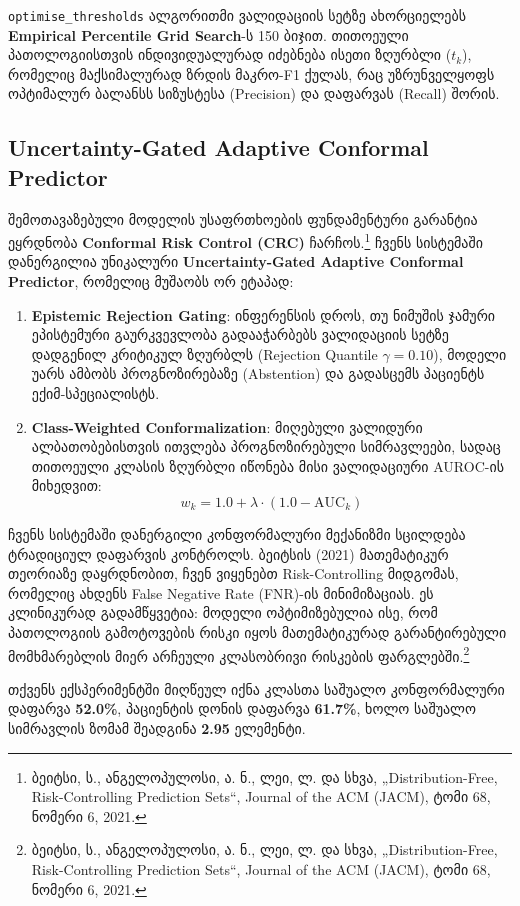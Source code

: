 \documentclass[12pt,a4paper,oneside]{report}
\begin{document}
\texttt{optimise\_thresholds} ალგორითმი ვალიდაციის სეტზე ახორციელებს \textbf{Empirical Percentile Grid Search}-ს 150 ბიჯით. თითოეული პათოლოგიისთვის ინდივიდუალურად იძებნება ისეთი ზღურბლი ($t_k$), რომელიც მაქსიმალურად ზრდის მაკრო-F1 ქულას, რაც უზრუნველყოფს ოპტიმალურ ბალანსს სიზუსტესა (Precision) და დაფარვას (Recall) შორის.

\subsection{Uncertainty-Gated Adaptive Conformal Predictor}
შემოთავაზებული მოდელის უსაფრთხოების ფუნდამენტური გარანტია ეყრდნობა \textbf{Conformal Risk Control (CRC)} ჩარჩოს.\footnote{ბეიტსი, ს., ანგელოპულოსი, ა. ნ., ლეი, ლ. და სხვა, „Distribution-Free, Risk-Controlling Prediction Sets“, Journal of the ACM (JACM), ტომი 68, ნომერი 6, 2021.} ჩვენს სისტემაში დანერგილია უნიკალური \textbf{Uncertainty-Gated Adaptive Conformal Predictor}, რომელიც მუშაობს ორ ეტაპად:

\begin{enumerate}[leftmargin=1.6em]
    \item \textbf{Epistemic Rejection Gating}: ინფერენსის დროს, თუ ნიმუშის ჯამური ეპისტემური გაურკვევლობა გადააჭარბებს ვალიდაციის სეტზე დადგენილ კრიტიკულ ზღურბლს (Rejection Quantile $\gamma = 0.10$), მოდელი უარს ამბობს პროგნოზირებაზე (Abstention) და გადასცემს პაციენტს ექიმ-სპეციალისტს. 
    \item \textbf{Class-Weighted Conformalization}: მიღებული ვალიდური ალბათობებისთვის ითვლება პროგნოზირებული სიმრავლეები, სადაც თითოეული კლასის ზღურბლი იწონება მისი ვალიდაციური AUROC-ის მიხედვით:
    \begin{equation}
    w_k = 1.0 + \lambda \cdot (1.0 - \text{AUC}_k)
    \end{equation}
\end{enumerate}

ჩვენს სისტემაში დანერგილი კონფორმალური მექანიზმი სცილდება ტრადიციულ დაფარვის კონტროლს. ბეიტსის (2021) მათემატიკურ თეორიაზე დაყრდნობით, ჩვენ ვიყენებთ Risk-Controlling მიდგომას, რომელიც ახდენს False Negative Rate (FNR)-ის მინიმიზაციას. ეს კლინიკურად გადამწყვეტია: მოდელი ოპტიმიზებულია ისე, რომ პათოლოგიის გამოტოვების რისკი იყოს მათემატიკურად გარანტირებული მომხმარებლის მიერ არჩეული კლასობრივი რისკების ფარგლებში.\footnote{ბეიტსი, ს., ანგელოპულოსი, ა. ნ., ლეი, ლ. და სხვა, „Distribution-Free, Risk-Controlling Prediction Sets“, Journal of the ACM (JACM), ტომი 68, ნომერი 6, 2021.} 

თქვენს ექსპერიმენტში მიღწეულ იქნა კლასთა საშუალო კონფორმალური დაფარვა \textbf{52.0\%}, პაციენტის დონის დაფარვა \textbf{61.7\%}, ხოლო საშუალო სიმრავლის ზომამ შეადგინა \textbf{2.95} ელემენტი.
\end{document}
